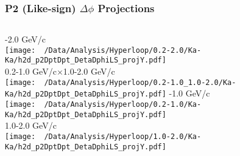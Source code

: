\documentclass{beamer}
\begin{document}
\begin{frame}
	\frametitle{P2 (Like-sign) $\Delta\phi$ Projections}
	\begin{columns}
		-2.0 GeV/c\\
		\texttt{[image: ~/Data/Analysis/Hyperloop/0.2-2.0/Ka-Ka/h2d\_p2DptDpt\_DetaDphiLS\_projY.pdf]}\\0.2-1.0 GeV/c$\times$1.0-2.0 GeV/c\\
		\texttt{[image: ~/Data/Analysis/Hyperloop/0.2-1.0\_1.0-2.0/Ka-Ka/h2d\_p2DptDpt\_DetaDphiLS\_projY.pdf]}
		-1.0 GeV/c\\
		\texttt{[image: ~/Data/Analysis/Hyperloop/0.2-1.0/Ka-Ka/h2d\_p2DptDpt\_DetaDphiLS\_projY.pdf]}\\1.0-2.0 GeV/c\\
		\texttt{[image: ~/Data/Analysis/Hyperloop/1.0-2.0/Ka-Ka/h2d\_p2DptDpt\_DetaDphiLS\_projY.pdf]}
	\end{columns}
\end{frame}
\end{document}
